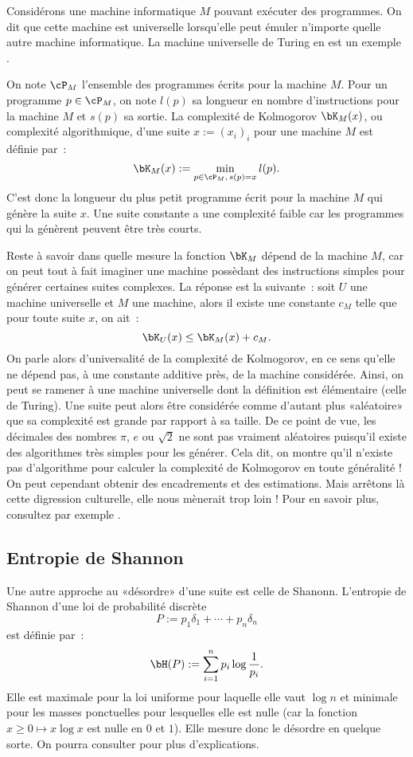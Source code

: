 Considérons une machine informatique $M$ pouvant exécuter des programmes.  On
dit que cette machine est universelle lorsqu'elle peut émuler n'importe quelle
autre machine informatique. La machine universelle de Turing en est un exemple
\cite{turing-girard}.
 
On note $\cP_M$ l'ensemble des programmes écrits pour la machine $M$. Pour un
programme $p\in\cP_M$, on note $l(p)$ sa longueur en nombre d'instructions pour
la machine $M$ et $s(p)$ sa sortie. La complexité de Kolmogorov $\bK_M(x)$, ou
complexité algorithmique, d'une suite $x:=(x_i)_i$ pour une machine $M$ est
définie par~:
$$
\bK_M(x):=\min_{p\in\cP_M,\,s(p)=x} l(p).
$$
C'est donc la longueur du plus petit programme écrit pour la machine $M$
qui génère la suite $x$.  Une suite constante a une complexité faible car les
programmes qui la génèrent peuvent être très courts.

Reste à savoir dans quelle mesure la fonction $\bK_M$ dépend de la machine
$M$, car on peut tout à fait imaginer une machine possèdant des instructions
simples pour générer certaines suites complexes. La réponse est la suivante~:
soit $U$ une machine universelle et $M$ une machine, alors il existe une
constante $c_M$ telle que pour toute suite $x$, on ait~:
$$
\bK_U(x) \leq \bK_M(x)+c_M.
$$
On parle alors d'universalité de la complexité de Kolmogorov, en ce sens
qu'elle ne dépend pas, à une constante additive près, de la machine
considérée. Ainsi, on peut se ramener à une machine universelle dont la
définition est élémentaire (celle de Turing). Une suite peut alors être
considérée comme d'autant plus «aléatoire» que sa complexité est grande par
rapport à sa taille. De ce point de vue, les décimales des nombres $\pi$, $e$ ou
$\sqrt{2}$ ne sont pas vraiment aléatoires puisqu'il existe des algorithmes
très simples pour les générer. Cela dit, on montre qu'il n'existe pas
d'algorithme pour calculer la complexité de Kolmogorov en toute généralité !
On peut cependant obtenir des encadrements et des estimations. Mais arrêtons
là cette digression culturelle, elle nous mènerait trop loin ! Pour en savoir
plus, consultez par exemple \cite[chap. 7]{cover-thomas}.

\subsection{Entropie de Shannon}\label{ss:shannon}

Une autre approche au «désordre» d'une suite est celle de Shanonn. L'entropie
de Shannon d'une loi de probabilité discrète 
$$P:=p_1\delta_1+\cdots+p_n\delta_n$$
est définie par~:
$$
\bH(P):=\sum_{i=1}^n p_i\log \frac{1}{p_i}.
$$
Elle est maximale pour la loi uniforme pour laquelle elle vaut $\log n$ et
minimale pour les masses ponctuelles pour lesquelles elle est nulle (car la
fonction $x\geq 0\mapsto x\log x$ est nulle en $0$ et $1$). Elle mesure donc
le désordre en quelque sorte. On pourra consulter \cite[chap. 6]{applebaum}
pour plus d'explications.


